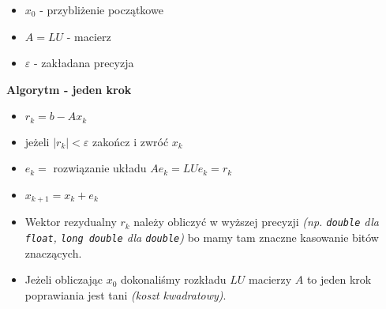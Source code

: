 \documentclass[../mn-notatki.tex]{subfiles}
\begin{document}
\begin{itemize}
    \item $x_0$ - przybliżenie początkowe
    \item $A = LU$ - macierz
    \item $\varepsilon$ - zakładana precyzja
\end{itemize}
\begin{tcolorbox}
\textbf{Algorytm - jeden krok}
\begin{itemize}
    \item $r_k = b - Ax_k$
    \item jeżeli $|r_k| < \varepsilon$ zakończ i zwróć $x_k$
    \item $e_k = $ rozwiązanie układu $Ae_k = LUe_k = r_k$
    \item $x_{k+1} = x_k + e_k$
\end{itemize}
\end{tcolorbox}

\begin{itemize}
    \item Wektor rezydualny $r_k$ należy obliczyć w wyższej precyzji
    \textit{(np. \texttt{double} dla \texttt{float}, \texttt{long double} dla
    \texttt{double})} bo mamy tam znaczne kasowanie bitów znaczących.
    \item Jeżeli obliczając $x_0$ dokonaliśmy rozkładu $LU$ macierzy $A$ to
    jeden krok poprawiania jest tani \textit{(koszt kwadratowy)}.
\end{itemize}


\pagebreak
\end{document}
